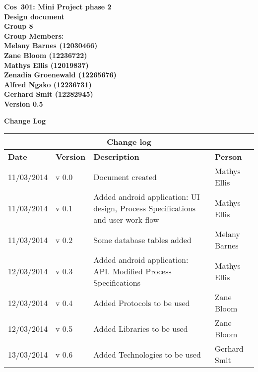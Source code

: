 \documentclass[12pt]{article}
\newcommand{\Title}{Design document} %
\newcommand{\Class}{Cos\ 301} %
\begin{document}
	\vspace{4em}
	
	\begin{center}%
	\LARGE \bf \Class: Mini Project phase 2 \\
	  \LARGE \bf \Title \\[4em]
	  \LARGE {\bf Group 8}\\[1em]
	  \LARGE {\bf Group Members:}\\[2em]
	  \large
	     Melany Barnes					(12030466) \\[1em]
	     Zane Bloom						(12236722) \\[1em]
	     Mathys Ellis					(12019837) \\[1em]
	     Zenadia Groenewald				(12265676) \\[1em]
	     Alfred Ngako					(12236731) \\[1em]
	  	 Gerhard Smit					(12282945) \\[1em]
	     {\bf Version 0.5}
	    
	\end{center}
	
	\newpage
		{\LARGE \bf Change Log}\\[2em]
		
		\begin{center}
		\begin{tabular}{|l|p{1.4cm}|p{8cm}|p{2.8cm}|}
		\hline
		\multicolumn{4}{|c|}{\bf Change log} \\
		\hline
		\bf Date & \bf Version & \bf Description & \bf Person \\
		\hline
		11/03/2014 & v 0.0 & Document created & Mathys Ellis \\
		\hline
		11/03/2014 & v 0.1 & Added android application: UI design, Process Specifications and user work flow & Mathys Ellis \\
		\hline
		11/03/2014 & v 0.2 & Some database tables added & Melany Barnes \\
		\hline
		12/03/2014 & v 0.3 & Added android application: API. Modified Process Specifications & Mathys Ellis \\
		\hline
		12/03/2014 & v 0.4 & Added Protocols to be used & Zane Bloom \\
		\hline
		12/03/2014 & v 0.5 & Added Libraries to be used & Zane Bloom \\
		\hline
		13/03/2014 & v 0.6 & Added Technologies to be used & Gerhard Smit \\
		\hline
		
		\end{tabular}
		\end{center}
		
\end{document}
